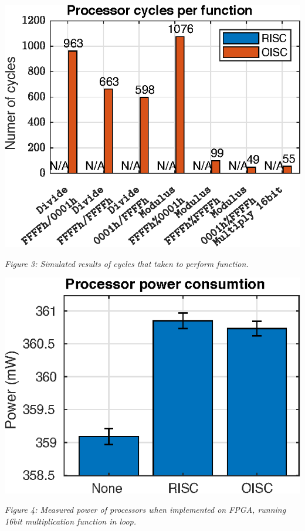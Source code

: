 \documentclass[portrait,color=UCLmidgreen,margin=1.5cm,bannerheight=8cm,logoheight=2.5cm]{uclposter}
\begin{document}
\begin{tcolorbox}[title=Results]
\begin{multicols}{3}
		\columnbreak
		\includegraphics[width=\linewidth]{../tests/cycles.eps}
		\begin{center}
			\textit{Figure 3: Simulated results of cycles that taken to perform function. }
		\end{center}
	
		\columnbreak
		\includegraphics[width=\linewidth]{../tests/power.eps}
		\begin{center}
			\textit{Figure 4: Measured power of processors when implemented on FPGA, running 16bit multiplication function in loop.}
		\end{center}

	\end{multicols}
	

\end{tcolorbox}
\end{document}
